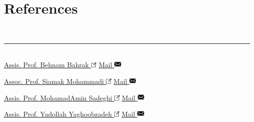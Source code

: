 \documentclass[]{rahulworld-resume}
\begin{document}
\begin{minipage}[t]{0.97\textwidth}
\begin{minipage}[t]{0.42\textwidth}
		\section{References}\vspace{-4pt}{\normalsize\normalfont Sorted alphabetically.}\vspace{-8pt}\\
		\noindent\rule{\textwidth}{0.4pt}\vspace{4pt}\\
		\centering
		\href{https://ece.ut.ac.ir/en/~Bahrak}{Assis. Prof. Behnam Bahrak \includegraphics[width=8pt]{icons/redirect.png}}
		\hfill
		\href{mailto:bahrak@ut.ac.ir}{Mail \includegraphics[width=10pt]{icons/mail.png}}


		\vspace{5pt}
		\href{https://ece.ut.ac.ir/en/~smohamadi}{Assoc. Prof. Siamak Mohammadi \includegraphics[width=8pt]{icons/redirect.png}}
		\hfill
		\href{mailto:smohamadi@ut.ac.ir}{Mail \includegraphics[width=10pt]{icons/mail.png}}

		\vspace{5pt}
		\href{https://ece.ut.ac.ir/en/~asadeghi}{Assis. Prof. MohamadAmin Sadeghi \includegraphics[width=8pt]{icons/redirect.png}}
		\hfill
		\href{mailto:asadeghi@ut.ac.ir}{Mail \includegraphics[width=10pt]{icons/mail.png}}

		\vspace{5pt}
		\href{https://yyaghoobzadeh.github.io/}{Assis. Prof. Yadollah Yaghoobzadeh \includegraphics[width=8pt]{icons/redirect.png}}
		\hfill
		\href{mailto:y.yaghoobzadeh@ut.ac.ir}{Mail \includegraphics[width=10pt]{icons/mail.png}}
	\end{minipage}
\end{minipage}
\end{document}

